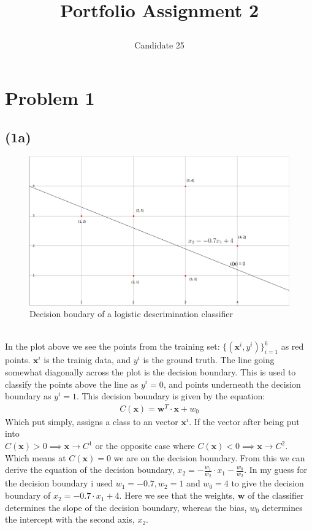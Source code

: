\documentclass[12pt, letterpaper]{article}
\title{ \begin{huge}
\textbf{Portfolio Assignment 2}
\end{huge} }
\author{Candidate 25}
\date{}
\newcommand{\bs}{\boldsymbol}
\newcommand{\mbf}{\mathbf}
\begin{document}
\maketitle
  \section*{Problem 1}
    \subsection*{(1a)}
      \begin{figure}[H]
        \caption{Decision boudary of a logistic descrimination classifier}
        \centering
        \includegraphics[width=\textwidth,keepaspectratio=true,height=\textheight-\the\textundbildtextheight]{decisionboundary_1a}
      \end{figure}\\
      In the plot above we see the points from the training set: $\{(\mbf{x}^i, y^i)\}_{i=1}^6$ as red points. $\mbf{x}^i$ is the trainig data, and $y^i$ is the ground truth. The line going somewhat diagonally across the plot is the decision boundary. This is used to classify the points above the line as $y^i = 0$, and points underneath the decision boundary as $y^i = 1$. This decision boundary is given by the equation:
      \begin{align} \label{eq1}
        C(\mbf{x}) = \bs{w}^T \cdot \mbf{x} + w_0
      \end{align}
      Which put simply, assigns a class to an vector $\mbf{x}^i$. If the vector after being put into\\ $C(\mbf{x}) > 0 \implies \mbf{x} \rightarrow C^1$ or the opposite case where $C(\mbf{x}) < 0 \implies \mbf{x} \rightarrow C^2$. Which means at $C(\mbf{x}) = 0$ we are on the decision boundary. From this we can derive the equation of the decision boundary, $x_2 = -\frac{w_1}{w_2}\cdot x_1 - \frac{w_0}{w_2}$. In my guess for the decision boundary i used $w_1 = -0.7, w_2 = 1$ and $ w_0 = 4$ to give the decision boundary of $x_2 = -0.7 \cdot x_1 + 4$. Here we see that the weights, $\bs{w}$ of the classifier determines the slope of the decision boundary, whereas the bias, $w_0$ determines the intercept with the second axis, $x_2$.\\
\end{document}
